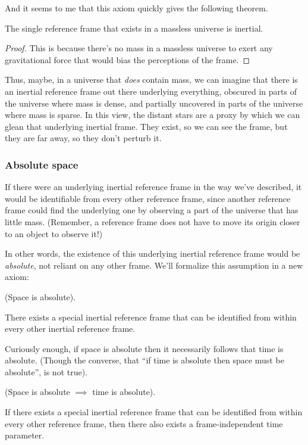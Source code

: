 \documentclass{article}
\begin{document}
And it seems to me that this axiom quickly gives the following theorem.

\begin{theorem}
	The single reference frame that exists in a massless universe is inertial.
\end{theorem}

\begin{proof}
	This is because there's no mass in a massless universe to exert any gravitational force that would bias the perceptions of the frame.
\end{proof}

Thus, maybe, in a universe that \textit{does} contain mass, we can imagine that there is an inertial reference frame out there underlying everything, obscured in parts of the universe where mass is dense, and partially uncovered in parts of the universe where mass is sparse. In this view, the distant stars are a proxy by which we can glean that underlying inertial frame. They exist, so we can see the frame, but they are far away, so they don't perturb it.

\subsubsection*{Absolute space}

If there were an underlying inertial reference frame in the way we've described, it would be identifiable from every other reference frame, since another reference frame could find the underlying one by observing a part of the universe that has little mass. (Remember, a reference frame does not have to move its origin closer to an object to observe it!)

In other words, the existence of this underlying inertial reference frame would be \textit{absolute}, not reliant on any other frame. We'll formalize this assumption in a new axiom:

\begin{axiom}
	(Space is absolute).
	
	There exists a special inertial reference frame that can be identified from within every other inertial reference frame.
\end{axiom}

Curiously enough, if space is absolute then it necessarily follows that time is absolute. (Though the converse, that ``if time is absolute then space must be absolute'', is not true).

\begin{theorem}
	(Space is absolute $\implies$ time is absolute).
	
	If there exists a special inertial reference frame that can be identified from within every other reference frame, then there also exists a frame-independent time parameter.
\end{theorem}
\end{document}
